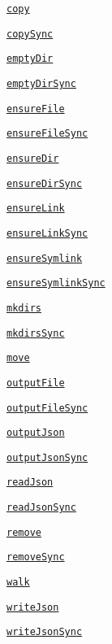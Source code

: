 \begin{DoxyItemize}
\item \href{#copy}{\tt copy}
\item \href{#copy}{\tt copy\+Sync}
\item \href{#emptydirdir-callback}{\tt empty\+Dir}
\item \href{#emptydirdir-callback}{\tt empty\+Dir\+Sync}
\item \href{#ensurefilefile-callback}{\tt ensure\+File}
\item \href{#ensurefilefile-callback}{\tt ensure\+File\+Sync}
\item \href{#ensuredirdir-callback}{\tt ensure\+Dir}
\item \href{#ensuredirdir-callback}{\tt ensure\+Dir\+Sync}
\item \href{#ensurelinksrcpath-dstpath-callback}{\tt ensure\+Link}
\item \href{#ensurelinksrcpath-dstpath-callback}{\tt ensure\+Link\+Sync}
\item \href{#ensuresymlinksrcpath-dstpath-type-callback}{\tt ensure\+Symlink}
\item \href{#ensuresymlinksrcpath-dstpath-type-callback}{\tt ensure\+Symlink\+Sync}
\item \href{#mkdirsdir-callback}{\tt mkdirs}
\item \href{#mkdirsdir-callback}{\tt mkdirs\+Sync}
\item \href{#movesrc-dest-options-callback}{\tt move}
\item \href{#outputfilefile-data-options-callback}{\tt output\+File}
\item \href{#outputfilefile-data-options-callback}{\tt output\+File\+Sync}
\item \href{#outputjsonfile-data-options-callback}{\tt output\+Json}
\item \href{#outputjsonfile-data-options-callback}{\tt output\+Json\+Sync}
\item \href{#readjsonfile-options-callback}{\tt read\+Json}
\item \href{#readjsonfile-options-callback}{\tt read\+Json\+Sync}
\item \href{#removedir-callback}{\tt remove}
\item \href{#removedir-callback}{\tt remove\+Sync}
\item \href{#walk}{\tt walk}
\item \href{#writejsonfile-object-options-callback}{\tt write\+Json}
\item \href{#writejsonfile-object-options-callback}{\tt write\+Json\+Sync}
\end{DoxyItemize}

